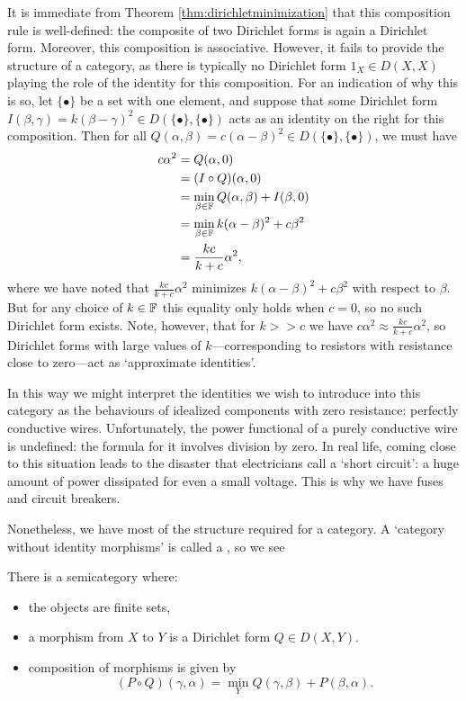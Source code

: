 It is immediate from Theorem \ref{thm:dirichletminimization} that this
composition rule is well-defined: the composite of two Dirichlet forms is again
a Dirichlet form. Moreover, this composition is associative. However, it fails
to provide the structure of a category, as there is typically no Dirichlet form
$1_X \in D(X,X)$ playing the role of the identity for this composition. For an
indication of why this is so, let $\{\bullet\}$ be a set with one element, and
suppose that some Dirichlet form $I(\beta,\gamma) = k(\beta-\gamma)^2 \in
D(\{\bullet\},\{\bullet\})$ acts as an identity on the right for this
composition. Then for all $Q(\alpha,\beta) = c(\alpha-\beta)^2 \in
D(\{\bullet\},\{\bullet\})$, we must have
\begin{align*}
  c\alpha^2 &= Q(\alpha,0) \\
  &= (I \circ Q)(\alpha,0) \\ 
  &= \min_{\beta \in {\mathbb F}} Q(\alpha, \beta) + I(\beta,0) \\
  &= \min_{\beta \in {\mathbb F}} k(\alpha-\beta)^2 + c\beta^2 \\
  &= \frac{kc}{k+c}\alpha^2,
\end{align*}
where we have noted that $\frac{kc}{k+c}\alpha^2$ minimizes $k(\alpha-\beta)^2 +
c\beta^2$ with respect to $\beta$. But for any choice of $k \in {\mathbb F}$ this
equality only holds when $c = 0$, so no such Dirichlet form exists. Note,
however, that for $k>> c$ we have $c\alpha^2 \approx \frac{kc}{k+c}\alpha^2$, so
Dirichlet forms with large values of $k$---corresponding to resistors with
resistance close to zero---act as `approximate identities'.

In this way we might interpret the identities we wish to introduce
into this category as the behaviours of idealized components with zero
resistance: perfectly conductive wires. Unfortunately, the power functional of a
purely conductive wire is undefined: the formula for it involves division by
zero.  In real life, coming close to this situation leads to the disaster that
electricians call a `short circuit': a huge amount of power dissipated for even
a small voltage.  This is why we have fuses and circuit breakers.

Nonetheless, we have most of the structure required for a category. A `category
without identity morphisms' is called a , so we see
\begin{proposition}
There is a semicategory where:
\begin{itemize}
\item the objects are finite sets,

\item a morphism from $X$ to $Y$ is a Dirichlet form $Q \in D(X,Y)$.  

\item composition of morphisms is given by 
\[
(P \circ Q)(\gamma, \alpha) = \min_{Y} Q(\gamma, \beta) + P(\beta, \alpha).
\]

\end{itemize}
\end{proposition}

